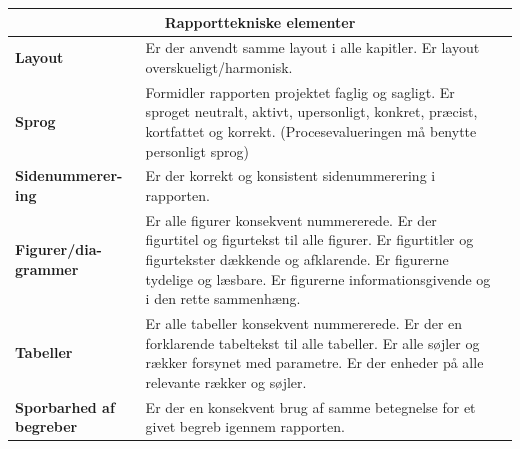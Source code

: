 \begin{longtable}{|p{30mm}|p{90mm}|p{25mm}|}
\hline
\multicolumn{3}{|c|}{\textbf{Rapporttekniske elementer}} \\ \hline

\textbf{Layout} & Er der anvendt samme layout i alle kapitler. 
Er layout overskueligt/harmonisk.
                                        &           \\ \hline

\textbf{Sprog} & Formidler rapporten projektet faglig og sagligt.
Er sproget  neutralt, aktivt, upersonligt, konkret, præcist, kortfattet og korrekt.
(Procesevalueringen må benytte personligt sprog)
                                        &           \\ \hline

\textbf{Sidenummerer-ing} & Er der korrekt og konsistent sidenummerering i rapporten. 
                                        &           \\ \hline

\textbf{Figurer/dia-grammer} & Er alle figurer konsekvent nummererede.
Er der figurtitel og figurtekst til alle figurer.
Er figurtitler og figurtekster dækkende og afklarende.
Er figurerne tydelige og læsbare.
Er figurerne informationsgivende og i den rette sammenhæng.
                                        &           \\ \hline

\textbf{Tabeller} & Er alle tabeller konsekvent nummererede.
Er der en forklarende tabeltekst til alle tabeller.
Er alle søjler og rækker forsynet med parametre.
Er der enheder på alle relevante rækker og søjler.
                                        &           \\ \hline

\textbf{Sporbarhed af begreber} & Er der en konsekvent brug af samme betegnelse for et givet begreb igennem rapporten. 
                                        &           \\ \hline



\end{longtable}

